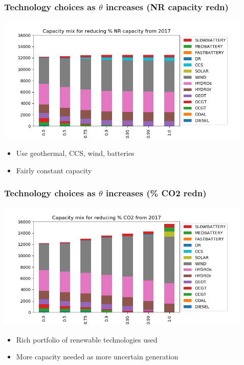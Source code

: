 \documentclass[xcolor=dvipsnames]{beamer}
\begin{document}
\begin{frame}
  \frametitle{Technology choices as $\theta$ increases (NR capacity redn)}

  \includegraphics[width=4.8in]{includes/Scaprednv20.png} \\
  \begin{itemize}
  \item Use geothermal, CCS, wind, batteries
  \item Fairly constant capacity
  \end{itemize}
\end{frame}

\begin{frame}
  \frametitle{Technology choices as $\theta$ increases (\% CO2 redn)}

  \includegraphics[width=4.8in]{includes/Sco2rednv20.png} \\
  \begin{itemize}
  \item Rich portfolio of renewable technologies used
  \item More capacity needed as more uncertain generation
  \end{itemize}
\end{frame}
\end{document}
